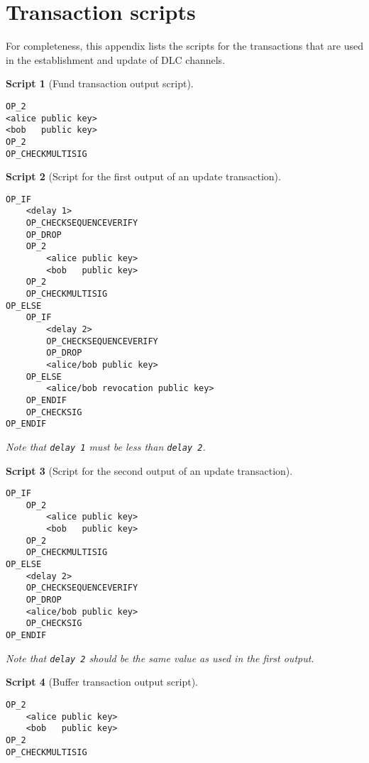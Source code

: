 \newtheorem{script}{Script}

\section{Transaction scripts}\label{append1}

For completeness, this appendix lists the scripts for the transactions that are used in the establishment and update of DLC channels.

\begin{script}[Fund transaction output script]\label{script:fundtx} \\
\begin{Verbatim}[samepage=true]
OP_2 
<alice public key> 
<bob   public key> 
OP_2 
OP_CHECKMULTISIG 
\end{Verbatim}
\end{script}

\begin{script}[Script for the first output of an update transaction]\label{script:updatetx1}\\
\begin{Verbatim}[samepage=true]
OP_IF
    <delay 1>
    OP_CHECKSEQUENCEVERIFY
    OP_DROP
    OP_2
        <alice public key>
        <bob   public key>
    OP_2
    OP_CHECKMULTISIG
OP_ELSE
    OP_IF
        <delay 2>
        OP_CHECKSEQUENCEVERIFY
        OP_DROP
        <alice/bob public key>
    OP_ELSE
        <alice/bob revocation public key>
    OP_ENDIF
    OP_CHECKSIG
OP_ENDIF
\end{Verbatim}
Note that \Verb _delay 1_ must be less than \Verb _delay 2_.
\end{script}

\begin{script}[Script for the second output of an update transaction]\label{script:updatetx2}\\
\begin{Verbatim}[samepage=true]
OP_IF
    OP_2
        <alice public key>
        <bob   public key>
    OP_2
    OP_CHECKMULTISIG
OP_ELSE
    <delay 2>
    OP_CHECKSEQUENCEVERIFY
    OP_DROP
    <alice/bob public key>
    OP_CHECKSIG
OP_ENDIF
\end{Verbatim}
Note that \Verb _delay 2_ should be the same value as used in the first output.
\end{script}

\begin{script}[Buffer transaction output script]\label{script:buffertx}\\
\begin{Verbatim}[samepage=true]
OP_2
    <alice public key>
    <bob   public key>
OP_2
OP_CHECKMULTISIG
\end{Verbatim}
\end{script}

